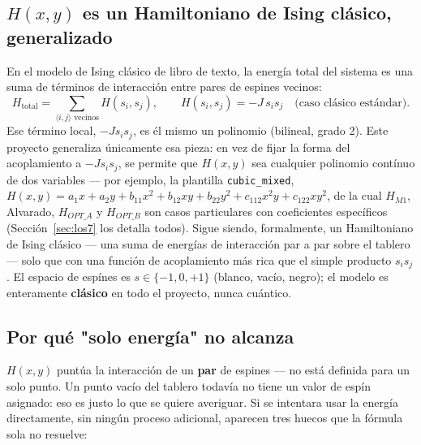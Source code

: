 \documentclass[11pt, a4paper]{article}
\begin{document}
\subsection{$H(x,y)$ es un Hamiltoniano de Ising cl\'asico, generalizado}

En el modelo de Ising cl\'asico de libro de texto, la energ\'ia total
del sistema es una suma de t\'erminos de interacci\'on entre pares de
espines vecinos:
\[
H_{\text{total}} = \sum_{\langle i,j\rangle \text{ vecinos}} H(s_i,s_j),
\qquad H(s_i,s_j) = -J\,s_i s_j \quad \text{(caso cl\'asico est\'andar)}.
\]
Ese t\'ermino local, $-Js_is_j$, es \'el mismo un polinomio (bilineal,
grado 2). Este proyecto generaliza \'unicamente esa pieza: en vez de
fijar la forma del acoplamiento a $-Js_is_j$, se permite que $H(x,y)$
sea cualquier polinomio cont\'inuo de dos variables --- por ejemplo,
la plantilla \texttt{cubic\_mixed},
$H(x,y)=a_1x+a_2y+b_{11}x^2+b_{12}xy+b_{22}y^2+c_{112}x^2y+c_{122}xy^2$,
de la cual $H_{M1}$, Alvarado, $H_{OPT\_A}$ y $H_{OPT\_B}$ son casos
particulares con coeficientes espec\'ificos (Secci\'on~\ref{sec:los7}
los detalla todos). Sigue siendo, formalmente, un Hamiltoniano de Ising
cl\'asico --- una suma de energ\'ias de interacci\'on par a par sobre
el tablero --- solo que con una funci\'on de acoplamiento m\'as rica
que el simple producto $s_is_j$. El espacio de esp\'ines es
$s\in\{-1,0,+1\}$ (blanco, vac\'io, negro); el modelo es enteramente
\textbf{cl\'asico} en todo el proyecto, nunca cu\'antico.

\subsection{Por qu\'e "solo energ\'ia" no alcanza}
\label{sec:por-que-boltzmann}

$H(x,y)$ punt\'ua la interacci\'on de un \textbf{par} de espines --- no
est\'a definida para un solo punto. Un punto vac\'io del tablero
todav\'ia no tiene un valor de esp\'in asignado: eso es justo lo que se
quiere averiguar. Si se intentara usar la energ\'ia directamente, sin
ning\'un proceso adicional, aparecen tres huecos que la f\'ormula sola
no resuelve:
\end{document}
